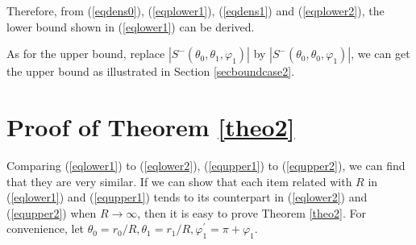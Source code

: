 \documentclass[journal, twoside]{IEEEtran}
\begin{document}
\begin{IEEEproof}
Therefore, from (\ref{eqdens0}), (\ref{eqplower1}), (\ref{eqdens1}) and (\ref{eqplower2}), 
the lower bound shown in (\ref{eqlower1}) can be derived.

As for the upper bound, replace $|S^-(\theta_0, \theta_1, \varphi_1)|$ by 
$|S^-(\theta_0, \theta_0, \varphi_1)|$, we can get the upper bound as illustrated in Section
 \ref{secboundcase2}.

\end{IEEEproof}


\section{Proof of Theorem \ref{theo2}} \label{app3}

Comparing (\ref{eqlower1}) to (\ref{eqlower2}), (\ref{equpper1}) to (\ref{equpper2}), we
can find that they are very similar. If we can show that each item related with $R$ in (\ref{eqlower1}) and (\ref{equpper1}) tends to its counterpart in (\ref{eqlower2}) and (\ref{equpper2}) when $R \to \infty$, then it is easy to prove Theorem \ref{theo2}. For convenience,  let $\theta_0 = r_0/R, \theta_1 = r_1/R, \varphi_1^\prime = \pi + \varphi_1$.
\end{document}
